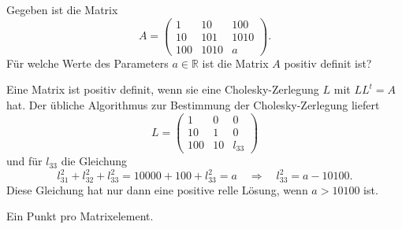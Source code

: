 Gegeben ist die Matrix
\[
A=\begin{pmatrix}
  1&   10&  100\\
 10&  101& 1010\\
100& 1010&  a
\end{pmatrix}.
\]
Für welche Werte des Parameters $a\in\mathbb R$ ist die Matrix
$A$ positiv definit ist?


\begin{loesung}
Eine Matrix ist positiv definit, wenn sie eine Cholesky-Zerlegung $L$ mit
$LL^t=A$ hat.
Der übliche Algorithmus zur Bestimmung der Cholesky-Zerlegung liefert
\[
L=\begin{pmatrix}
1&0&0\\
10&1&0\\
100&10&l_{33}
\end{pmatrix}
\]
und für $l_{33}$ die Gleichung
\[
l_{31}^2 + l_{32}^2 + l_{33}^2 = 10000 + 100 + l_{33}^2 = a
\quad\Rightarrow\quad
l_{33}^2 = a - 10100.
\]
Diese Gleichung hat nur dann eine positive relle Lösung, wenn $a > 10100$ ist.
\end{loesung}

\begin{bewertung}
Ein Punkt pro Matrixelement.
\end{bewertung}
